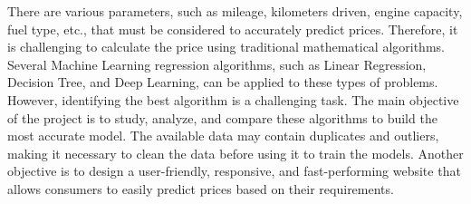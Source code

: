 \documentclass[a4paper,12pt]{article}
\begin{document}
\begin{titlepage}
\begin{justify}
There are various parameters, such as mileage, kilometers driven, engine capacity, fuel type, etc., that must be considered to accurately predict prices. Therefore, it is challenging to calculate the price using traditional mathematical algorithms. Several Machine Learning regression algorithms, such as Linear Regression, Decision Tree, and Deep Learning, can be applied to these types of problems. However, identifying the best algorithm is a challenging task. The main objective of the project is to study, analyze, and compare these algorithms to build the most accurate model. The available data may contain duplicates and outliers, making it necessary to clean the data before using it to train the models. Another objective is to design a user-friendly, responsive, and fast-performing website that allows consumers to easily predict prices based on their requirements.

\end{justify}

\end{titlepage}

\newpage
\end{document}
